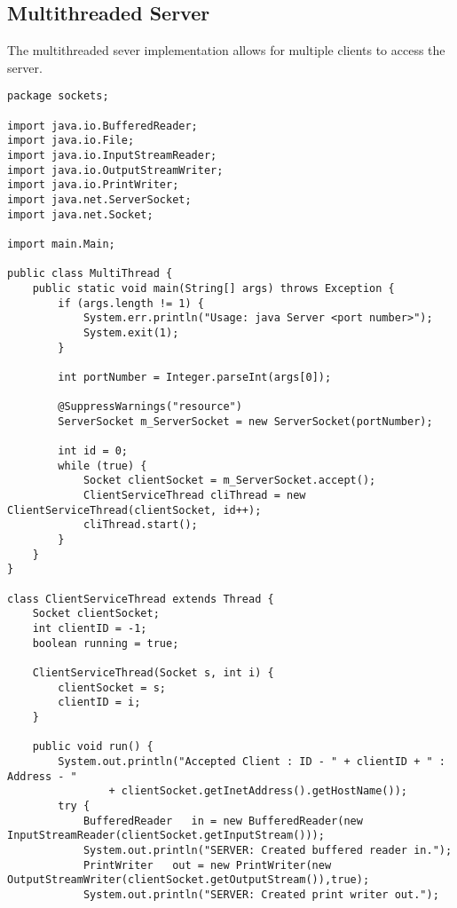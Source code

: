 \documentclass{article}
\begin{document}
	\subsection{Multithreaded Server}
	The multithreaded sever implementation allows for multiple clients to access the server.
		\begin{lstlisting}
package sockets;

import java.io.BufferedReader;
import java.io.File;
import java.io.InputStreamReader;
import java.io.OutputStreamWriter;
import java.io.PrintWriter;
import java.net.ServerSocket;
import java.net.Socket;

import main.Main;

public class MultiThread {
	public static void main(String[] args) throws Exception {
		if (args.length != 1) {
			System.err.println("Usage: java Server <port number>");
			System.exit(1);
		}

		int portNumber = Integer.parseInt(args[0]);
		
		@SuppressWarnings("resource")
		ServerSocket m_ServerSocket = new ServerSocket(portNumber);
		
		int id = 0;
		while (true) {
			Socket clientSocket = m_ServerSocket.accept();
			ClientServiceThread cliThread = new ClientServiceThread(clientSocket, id++);
			cliThread.start();
		}
	}
}

class ClientServiceThread extends Thread {
	Socket clientSocket;
	int clientID = -1;
	boolean running = true;

	ClientServiceThread(Socket s, int i) {
		clientSocket = s;
		clientID = i;
	}

	public void run() {
		System.out.println("Accepted Client : ID - " + clientID + " : Address - "
				+ clientSocket.getInetAddress().getHostName());
		try {
			BufferedReader   in = new BufferedReader(new InputStreamReader(clientSocket.getInputStream()));
			System.out.println("SERVER: Created buffered reader in.");
			PrintWriter   out = new PrintWriter(new OutputStreamWriter(clientSocket.getOutputStream()),true);
			System.out.println("SERVER: Created print writer out.");
            

\end{lstlisting}
\end{document}
